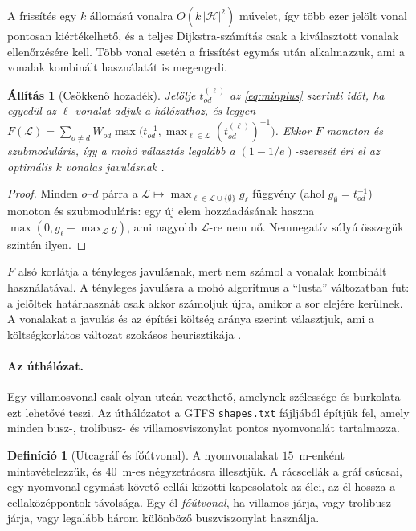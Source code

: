 \documentclass[12pt,a4paper]{article}
\newtheorem{allitas}[tetel]{Állítás}
\theoremstyle{definition}
\newtheorem{definicio}[tetel]{Definíció}
\theoremstyle{remark}
\newcommand{\Hs}{\mathcal{H}}
\newcommand{\Ls}{\mathcal{L}}
\begin{document}
A frissítés egy $k$ állomású vonalra $O(k\,|\Hs|^2)$ művelet, így több ezer
jelölt vonal pontosan kiértékelhető, és a teljes Dijkstra-számítás csak a
kiválasztott vonalak ellenőrzésére kell. Több vonal esetén a frissítést
egymás után alkalmazzuk, ami a vonalak kombinált használatát is megengedi.

\begin{allitas}[Csökkenő hozadék]
\label{all:szubmod}
Jelölje $t^{(\ell)}_{od}$ az \eqref{eq:minplus} szerinti időt, ha egyedül az
$\ell$ vonalat adjuk a hálózathoz, és legyen
$F(\Ls)=\sum_{o\ne d}W_{od}\max\bigl(t_{od}^{-1},\max_{\ell\in\Ls}(t^{(\ell)}_{od})^{-1}\bigr)$.
Ekkor $F$ monoton és szubmoduláris, így a mohó választás legalább a
$(1-1/e)$-szeresét éri el az optimális $k$ vonalas javulásnak
\citep{nemhauser1978}.
\end{allitas}

\begin{proof}
Minden $o$--$d$ párra a $\Ls\mapsto\max_{\ell\in\Ls\cup\{\emptyset\}}g_\ell$
függvény (ahol $g_\emptyset=t_{od}^{-1}$) monoton és szubmoduláris: egy új
elem hozzáadásának haszna $\max(0,g_\ell-\max_{\Ls}g)$, ami nagyobb $\Ls$-re
nem nő. Nemnegatív súlyú összegük szintén ilyen.
\end{proof}

$F$ alsó korlátja a tényleges javulásnak, mert nem számol a vonalak
kombinált használatával. A tényleges javulásra a mohó algoritmus a
\enquote{lusta} változatban fut: a jelöltek határhasznát csak akkor számoljuk
újra, amikor a sor elejére kerülnek. A vonalakat a javulás és az építési
költség aránya szerint választjuk, ami a költségkorlátos változat
szokásos heurisztikája \citep{khuller1999}.

\paragraph{Az úthálózat.}
Egy villamosvonal csak olyan utcán vezethető, amelynek szélessége és
burkolata ezt lehetővé teszi. Az úthálózatot a GTFS \texttt{shapes.txt}
fájljából építjük fel, amely minden busz-, trolibusz- és villamosviszonylat
pontos nyomvonalát tartalmazza.

\begin{definicio}[Utcagráf és főútvonal]
A nyomvonalakat $15$~m-enként mintavételezzük, és $40$~m-es négyzetrácsra
illesztjük. A rácscellák a gráf csúcsai, egy nyomvonal egymást követő cellái
közötti kapcsolatok az élei, az él hossza a cellaközéppontok távolsága.
Egy él \emph{főútvonal}, ha villamos járja, vagy trolibusz járja, vagy
legalább három különböző buszviszonylat használja.
\end{definicio}
\end{document}
